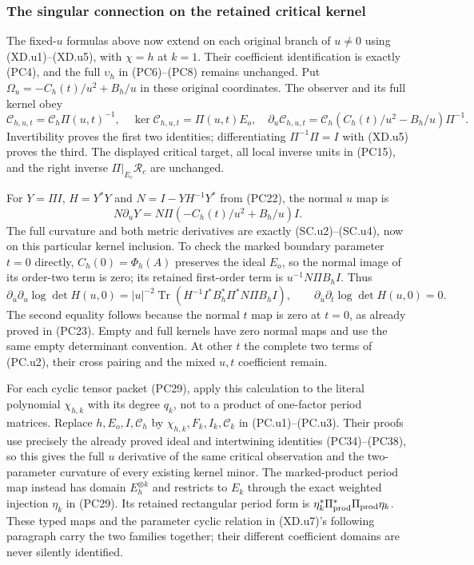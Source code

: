 
\subsubsection{The singular connection on the retained critical kernel}
The fixed-$u$ formulas above now extend on each original branch
of $u\ne0$ using (XD.u1)--(XD.u5), with $\chi=h$ at $k=1$.
Their coefficient identification is exactly (PC4), and the full
$\upsilon_h$ in (PC6)--(PC8) remains unchanged.  Put
$\Omega_u=-C_h(t)/u^2+B_h/u$ in these original coordinates.
The observer and its full kernel obey
\[
 \mathcal C_{h,u,t}=\mathcal C_h\Pi(u,t)^{-1},\quad
 \ker\mathcal C_{h,u,t}=\Pi(u,t)E_o,\quad
 \partial_u\mathcal C_{h,u,t}
       =\mathcal C_h(C_h(t)/u^2-B_h/u)\Pi^{-1}.
 \tag{PC.u1}
\]
Invertibility proves the first two identities; differentiating
$\Pi^{-1}\Pi=I$ with (XD.u5) proves the third.
The displayed critical target, all local inverse units in (PC15),
and the right inverse $\Pi|_{E_c}\mathcal R_c$ are unchanged.

For $Y=\Pi I$, $H=Y^*Y$ and $N=I-YH^{-1}Y^*$ from (PC22),
the normal $u$ map is
\[
 N\partial_uY=N\Pi(-C_h(t)/u^2+B_h/u)I.              \tag{PC.u2}
\]
The full curvature and both metric derivatives are exactly
(SC.u2)--(SC.u4), now on this particular kernel inclusion.
To check the marked boundary parameter $t=0$ directly,
$C_h(0)=\Phi_h(A)$ preserves the ideal $E_o$, so the
normal image of its order-two term is zero; its retained
first-order term is $u^{-1}N\Pi B_hI$.
Thus
\[
 \partial_{\bar u}\partial_u\log\det H(u,0)
 =|u|^{-2}\operatorname{Tr}
   (H^{-1}I^*B_h^*\Pi^*N\Pi B_hI),\qquad
 \partial_{\bar u}\partial_t\log\det H(u,0)=0.
 \tag{PC.u3}
\]
The second equality follows because the normal $t$ map is zero
at $t=0$, as already proved in (PC23).  Empty and full kernels
have zero normal maps and use the same empty determinant
convention.  At other $t$ the complete two terms of (PC.u2),
their cross pairing and the mixed $u,t$ coefficient remain.

For each cyclic tensor packet (PC29), apply this calculation
to the literal polynomial $\chi_{h,k}$ with its degree $q_k$,
not to a product of one-factor period matrices.  Replace
$h,E_o,I,\mathcal C_h$ by
$\chi_{h,k},F_k,I_k,\mathcal C_k$ in (PC.u1)--(PC.u3).
Their proofs use precisely the already proved ideal and
intertwining identities (PC34)--(PC38), so this gives the
full $u$ derivative of the same critical observation and the
two-parameter curvature of every existing kernel minor.
The marked-product period map instead has domain
$E_h^{\otimes k}$ and restricts to $E_k$ through the exact
weighted injection $\eta_k$ in (PC29).  Its retained
rectangular period form is
$\eta_k^*\Pi_{\rm prod}^*\Pi_{\rm prod}\eta_k$.
These typed maps and the parameter cyclic relation in
(XD.u7)'s following paragraph carry the two families together;
their different coefficient domains are never silently identified.
